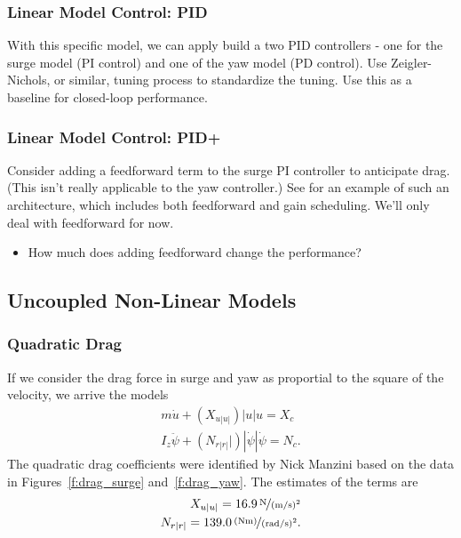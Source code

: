 \documentclass[11pt,draftcls,journal,onecolumn]{IEEEtran}
\begin{document}
\subsubsection{Linear Model Control: PID}

With this specific model, we can apply build a two PID controllers - one for the surge model (PI control) and one of the yaw model (PD control).  Use Zeigler-Nichols, or similar, tuning process to standardize the tuning.  Use this as a baseline for closed-loop performance.

\subsubsection{Linear Model Control: PID+}
Consider adding a feedforward term to the surge PI controller to anticipate drag.  (This isn't really applicable to the yaw controller.)  See \cite{caccia00guidance} for an example of such an architecture, which includes both feedforward and gain scheduling.  We'll only deal with feedforward for now.
\begin{itemize}
\item How much does adding feedforward change the performance?
\end{itemize}



\subsection{Uncoupled Non-Linear Models}

\subsubsection{Quadratic Drag}
If we consider the drag force in surge and yaw as proportial to the square of the velocity, we arrive the models
\begin{eqnarray}
m \dot{u} +  \left(X_{u|u|}\right) |u| u = X_c \\
I_z \ddot{\psi} + \left(N_{r|r|}|\right)|\dot{\psi}|\dot{\psi} = N_c.
\end{eqnarray}
The quadratic drag coefficients were identified by Nick Manzini based on the data in Figures~\ref{f:drag_surge} and~\ref{f:drag_yaw}.  The estimates of the terms are
\begin{eqnarray}
X_{u|u|} = \unitfrac[16.9]{N}{(m/s)^2} \\
N_{r|r|} = \unitfrac[139.0]{(Nm)}{(rad/s)^2} .
\end{eqnarray}
\end{document}
